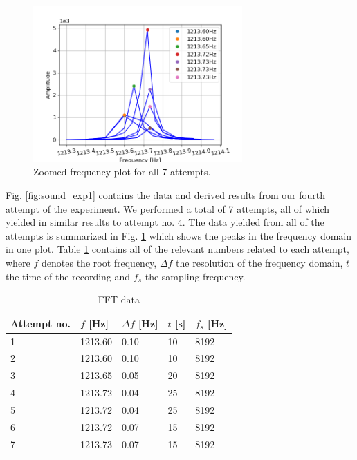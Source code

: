 \documentclass[11pt,a4paper]{article}
\begin{document}
    \begin{figure}[H]
      \centering 
      \includegraphics[width=8cm]{scripts/freq_exp2_all.png}
      \caption{Zoomed frequency plot for all 7 attempts.}
      \label{fig:sound_all}
    \end{figure}
    
    Fig. \ref{fig:sound_exp1} contains the data and derived results from our fourth attempt of the experiment. We performed a total of 7 attempts, all of which yielded in similar results to attempt no. 4. The data yielded from all of the attempts is summarized in Fig. \ref{fig:sound_all} which shows the peaks in the frequency domain in one plot.
    Table \ref{tab:fftdat} contains all of the relevant numbers related to each attempt, where $f$ denotes the root frequency, $\Delta f$ the resolution of the frequency domain, $t$ the time of the recording and $f_s$ the sampling frequency.


    \begin{table}[H]
      \center
      \caption{FFT data}
      \begin{tabular}{ | l | p{1.4cm} | l | l | l |}
          \hline
          Attempt no. & $f$ [Hz] & $\Delta f$ [Hz] & $t$ [s] & $f_s$ [Hz]\\ \hline
          1 & 1213.60 & 0.10 & 10 & 8192\\ \hline
          2 & 1213.60 & 0.10 & 10 & 8192\\ \hline
          3 & 1213.65 & 0.05 & 20 & 8192\\ \hline
          4 & 1213.72 & 0.04 & 25 & 8192\\ \hline
          5 & 1213.72 & 0.04 & 25 & 8192\\ \hline
          6 & 1213.72 & 0.07 & 15 & 8192\\ \hline
          7 & 1213.73 & 0.07 & 15 & 8192\\ \hline
      \end{tabular}
      \label{tab:fftdat}
    \end{table}
\end{document}
